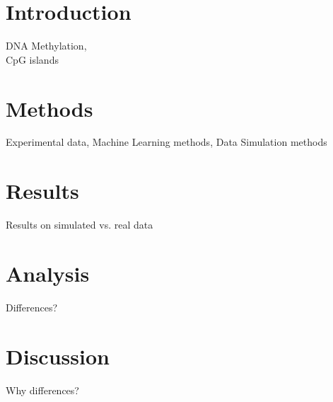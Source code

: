 \section{Introduction}

DNA Methylation, \\CpG islands

\section{Methods}

Experimental data, Machine Learning methods, Data Simulation methods

\section{Results}

Results on simulated vs. real data

\section{Analysis}

Differences?

\section{Discussion}

Why differences?




    
    
    
    
    
    
    
    